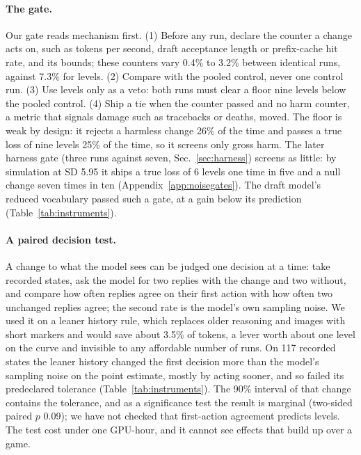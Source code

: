 \paragraph{The gate.}
Our gate reads mechanism first. %
(1) Before any run, declare the counter a change acts on, such as tokens per second, draft acceptance length or prefix-cache hit rate, and its bounds; these counters vary 0.4\% to 3.2\% between identical runs, against 7.3\% for levels. %
(2) Compare with the pooled control, never one control run. %
(3) Use levels only as a veto: both runs must clear a floor nine levels below the pooled control. %
(4) Ship a tie when the counter passed and no harm counter, a metric that signals damage such as tracebacks or deaths, moved.
The floor is weak by design: it rejects a harmless change 26\% of the time and passes a true loss of nine levels 25\% of the time, so it screens only gross harm. %
The later harness gate (three runs against seven, Sec.~\ref{sec:harness}) screens as little: by simulation at SD 5.95 it ships a true loss of 6 levels one time in five and a null change seven times in ten (Appendix~\ref{app:noisegates}). %
The draft model's reduced vocabulary passed such a gate, at a gain below its prediction (Table~\ref{tab:instruments}). %

\paragraph{A paired decision test.}
A change to what the model sees can be judged one decision at a time: take recorded states, ask the model for two replies with the change and two without, and compare how often replies agree on their first action with how often two unchanged replies agree; the second rate is the model's own sampling noise. %
We used it on a leaner history rule, which replaces older reasoning and images with short markers and would save about 3.5\% of tokens, a lever worth about one level on the curve and invisible to any affordable number of runs. %
On 117 recorded states the leaner history changed the first decision more than the model's sampling noise on the point estimate, mostly by acting sooner, and so failed its predeclared tolerance (Table~\ref{tab:instruments}). %
The 90\% interval of that change contains the tolerance, and as a significance test the result is marginal (two-sided paired $p$ 0.09); we have not checked that first-action agreement predicts levels. %
The test cost under one GPU-hour, and it cannot see effects that build up over a game. %

